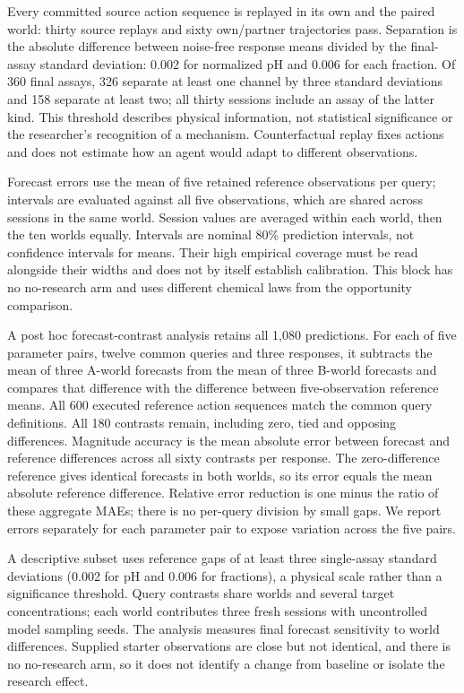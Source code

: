 \documentclass[12pt,a4paper]{article}
\begin{document}
Every committed source action sequence is replayed in its own and the paired world: thirty source replays and sixty own/partner trajectories pass. Separation is the absolute difference between noise-free response means divided by the final-assay standard deviation: 0.002 for normalized pH and 0.006 for each fraction. Of 360 final assays, 326 separate at least one channel by three standard deviations and 158 separate at least two; all thirty sessions include an assay of the latter kind. This threshold describes physical information, not statistical significance or the researcher's recognition of a mechanism. Counterfactual replay fixes actions and does not estimate how an agent would adapt to different observations.

Forecast errors use the mean of five retained reference observations per query; intervals are evaluated against all five observations, which are shared across sessions in the same world. Session values are averaged within each world, then the ten worlds equally. Intervals are nominal 80\% prediction intervals, not confidence intervals for means. Their high empirical coverage must be read alongside their widths and does not by itself establish calibration. This block has no no-research arm and uses different chemical laws from the opportunity comparison.

A post hoc forecast-contrast analysis retains all 1,080 predictions. For each of five parameter pairs, twelve common queries and three responses, it subtracts the mean of three A-world forecasts from the mean of three B-world forecasts and compares that difference with the difference between five-observation reference means. All 600 executed reference action sequences match the common query definitions. All 180 contrasts remain, including zero, tied and opposing differences. Magnitude accuracy is the mean absolute error between forecast and reference differences across all sixty contrasts per response. The zero-difference reference gives identical forecasts in both worlds, so its error equals the mean absolute reference difference. Relative error reduction is one minus the ratio of these aggregate MAEs; there is no per-query division by small gaps. We report errors separately for each parameter pair to expose variation across the five pairs.

A descriptive subset uses reference gaps of at least three single-assay standard deviations (0.002 for pH and 0.006 for fractions), a physical scale rather than a significance threshold. Query contrasts share worlds and several target concentrations; each world contributes three fresh sessions with uncontrolled model sampling seeds. The analysis measures final forecast sensitivity to world differences. Supplied starter observations are close but not identical, and there is no no-research arm, so it does not identify a change from baseline or isolate the research effect.
\end{document}
